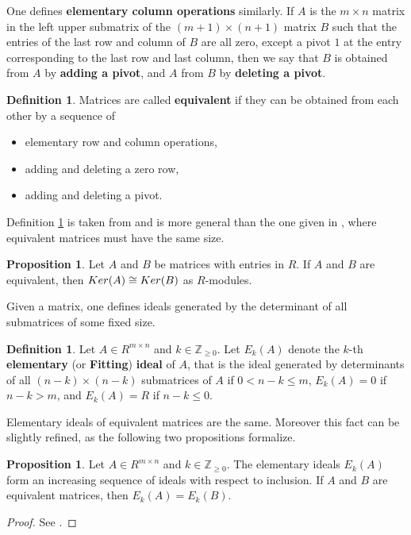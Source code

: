 \documentclass[11pt,a4paper]{article}
\theoremstyle{definition}
\newtheorem{proposition}[theorem]{Proposition}
\newtheorem{definition}[theorem]{Definition}
\newcommand{\numberset}{\mathbb}
\newcommand{\Z}{\numberset{Z}}
\newcommand{\Ker}{\textnormal{Ker}}
\begin{document}
One defines \textbf{elementary column operations} similarly.
If $A$  is the $m \times n$ matrix in the left upper submatrix of the $(m+1)\times (n+1)$ matrix $B$ such that the entries of the last row and column of $B$ are all zero, except a pivot $1$ at the entry corresponding to the last row and last column, then we say that $B$ is obtained from $A$ by \textbf{adding a pivot}, and $A$ from $B$ by \textbf{deleting a pivot}.

\begin{definition}\label{d-equiv-matrix}
Matrices are called \textbf{equivalent} if they can be obtained from each other by a sequence of
\begin{itemize}
    \item elementary row and column operations,
    \item adding and deleting a zero row, 
    \item adding and deleting a pivot.
\end{itemize}
\end{definition}

Definition \ref{d-equiv-matrix} is taken from \cite[Chapter VII \S 4]{crowell2012introduction} and is more general than the one given in  \cite[Chapter II]{newman1972}, where  equivalent matrices must have the same size.



\begin{proposition}\label{p-module-equiv}
Let $A$ and $B$ be  matrices with entries in $R$.
If $A$ and $B$ are equivalent, then $\Ker (A) \cong \Ker (B)$ as $R$-modules.
\end{proposition}

Given a matrix, one defines ideals generated by the determinant of all submatrices of some fixed size.

\begin{definition}\label{d-elem-id}
Let $A \in R^{m \times n}$ and $k \in \Z_{\geq 0}$. 
Let $E_k(A)$ denote the $k$-th \textbf{elementary} (or \textbf{Fitting}) \textbf{ideal} of $A$, that is the ideal generated by determinants of all $(n-k)\times (n-k)$ submatrices of $A$ if $0<n-k\leq m$, $E_k(A)=0$ if $n-k>m$, and $E_k(A)=R$ if $n-k\leq 0$. 
\end{definition}

Elementary ideals of equivalent matrices are the same. Moreover this fact can be slightly refined,
as the following two propositions formalize.

\begin{proposition}\label{p-elem-id-1}
Let $A \in R^{m \times n}$ and $k \in \Z_{\geq 0}$. The elementary ideals $E_k(A)$ form an increasing sequence of ideals with respect to inclusion. If $A$ and $B$ are equivalent matrices, then $E_k(A)=E_k(B)$.
\end{proposition}
\begin{proof}
See \cite[Chapter VII (4.1)]{crowell2012introduction}.
\end{proof}
\end{document}
